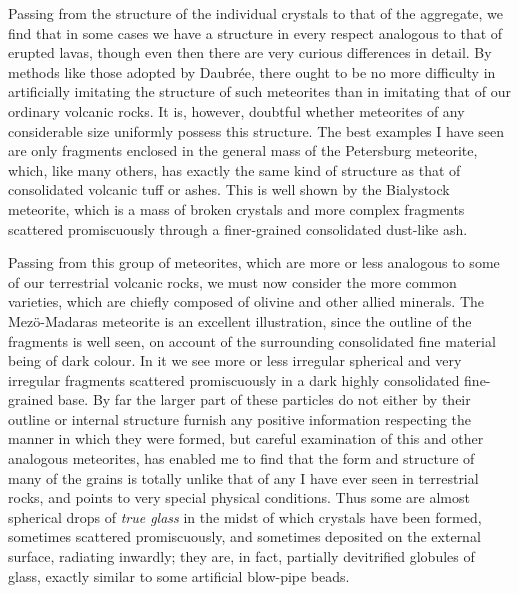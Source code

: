 \documentclass[a4paper, 12pt, oneside]{article}
\begin{document}
Passing from the structure of the individual crystals to that of the aggregate, we find that in some cases we have a structure in every respect analogous to that of erupted lavas, though even then there are very curious differences in detail. By methods like those adopted by Daubrée, there ought to be no more difficulty in artificially imitating the structure of such meteorites than in imitating that of our ordinary volcanic rocks. It is, however, doubtful whether meteorites of any considerable size uniformly possess this structure. The best examples I have seen are only fragments enclosed in the general mass of the Petersburg meteorite, which, like many others, has exactly the same kind of structure as that of consolidated volcanic tuff or ashes. This is well shown by the Bialystock meteorite, which is a mass of broken crystals and more complex fragments scattered promiscuously through a finer-grained consolidated dust-like ash.

Passing from this group of meteorites, which are more or less analogous to some of our terrestrial volcanic rocks, we must now consider the more common varieties, which are chiefly composed of olivine and other allied minerals. The Mezö-Madaras meteorite is an excellent illustration, since the outline of the fragments is well seen, on account of the surrounding consolidated fine material being of dark colour. In it we see more or less irregular spherical and very irregular fragments scattered promiscuously in a dark highly consolidated fine-grained base. By far the larger part of these particles do not either by their outline or internal structure furnish any positive information respecting the manner in which they were formed, but careful examination of this and other analogous meteorites, has enabled me to find that the form and structure of many of the grains is totally unlike that of any I have ever seen in terrestrial rocks, and points to very special physical conditions. Thus some are almost spherical drops of \emph{true glass} in the midst of which crystals have been formed, sometimes scattered promiscuously, and sometimes deposited on the external surface, radiating inwardly; they are, in fact, partially devitrified globules of glass, exactly similar to some artificial blow-pipe beads.
\end{document}
